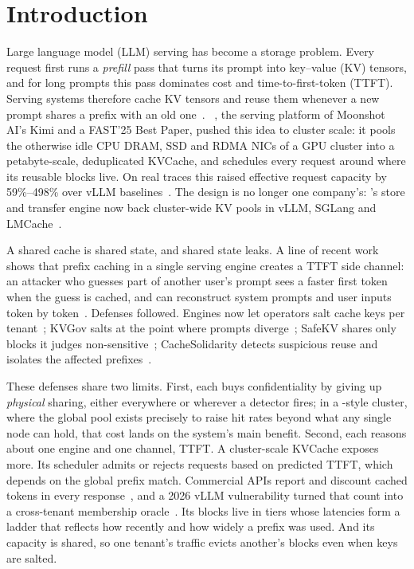 \section{Introduction}
\label{sec:intro}

Large language model (LLM) serving has become a storage problem. Every request
first runs a \emph{prefill} pass that turns its prompt into key--value (KV)
tensors, and for long prompts this pass dominates cost and time-to-first-token
(TTFT). Serving systems therefore cache KV tensors and reuse them whenever a new
prompt shares a prefix with an old one~\cite{kwon2023vllm,zheng2024sglang}.
\mc~\cite{qin2025mooncake}, the serving platform of Moonshot AI's Kimi and a
FAST'25 Best Paper, pushed this idea to cluster scale: it pools the otherwise idle
CPU DRAM, SSD and RDMA NICs of a GPU cluster into a petabyte-scale,
deduplicated KVCache, and schedules every request around where its reusable
blocks live. On real traces this raised effective request capacity by
59\%--498\% over vLLM baselines~\cite{qin2025mooncake}. The design is no longer
one company's: \mc's store and transfer engine now back cluster-wide KV pools in
vLLM, SGLang and LMCache~\cite{mooncakerepo,liu2025lmcache}.

A shared cache is shared state, and shared state leaks. A line of recent work
shows that prefix caching in a single serving engine creates a TTFT side channel:
an attacker who guesses part of another user's prompt sees a faster first token
when the guess is cached, and can reconstruct system prompts and user inputs
token by token~\cite{song2024earlybird,wu2025promptpeek,zheng2024inputsnatch}.
Defenses followed. Engines now let operators salt cache keys per
tenant~\cite{vllmcachesalt,dynamonvext}; KVGov salts at the point where prompts
diverge~\cite{addagada2026kvgov}; SafeKV shares only blocks it judges
non-sensitive~\cite{chu2025safekv}; CacheSolidarity detects suspicious reuse and
isolates the affected prefixes~\cite{pennas2026cachesolidarity}.

These defenses share two limits. First, each buys confidentiality by giving up
\emph{physical} sharing, either everywhere or wherever a detector fires; in a
\mc-style cluster, where the global pool exists precisely to raise hit rates
beyond what any single node can hold, that cost lands on the system's main
benefit. Second, each reasons about one engine and one channel, TTFT. A
cluster-scale KVCache exposes more. Its scheduler admits or rejects requests
based on predicted TTFT, which depends on the global prefix match. Commercial
APIs report and discount cached tokens in every
response~, and a 2026 vLLM vulnerability turned that count into a
cross-tenant membership oracle~\cite{cve2026105752}. Its blocks live in
tiers whose latencies form a ladder that reflects how recently and how widely a
prefix was used. And its capacity is shared, so one tenant's traffic evicts
another's blocks even when keys are salted.

